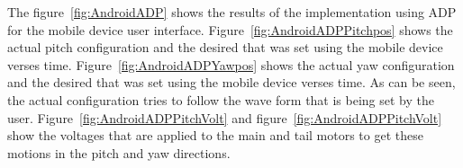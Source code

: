 The figure~\ref{fig:AndroidADP} shows the results of the implementation using ADP for the mobile device user interface.  Figure~\ref{fig:AndroidADPPitchpos} shows the actual pitch configuration and the desired that was set using the mobile device verses time.  Figure~\ref{fig:AndroidADPYawpos} shows the actual yaw configuration and the desired that was set using the mobile device verses time.  As can be seen, the actual configuration tries to follow the wave form that is being set by the user.  Figure~\ref{fig:AndroidADPPitchVolt} and figure~\ref{fig:AndroidADPPitchVolt} show the voltages that are applied to the main and tail motors to get these motions in the pitch and yaw directions.
\begin{figure}
    \centering
\end{figure}
